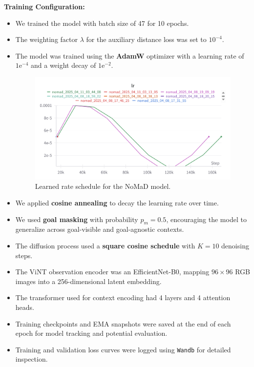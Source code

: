 \documentclass[12pt]{article}
\begin{document}
\begin{appendices}
\textbf{Training Configuration:}
 \begin{itemize}
     \item We trained the model with batch size of 47 for 10 epochs.
     \item The weighting factor $\lambda$ for the auxiliary distance loss was set to $10^{-4}$.
     \item The model was trained using the \textbf{AdamW} optimizer with a learning rate of $1\text{e}^{-4}$ and a weight decay of $1\text{e}^{-2}$.
        \begin{figure}[H]
            \centering
            \includegraphics[width=1\textwidth]{images/lr.png}
            \caption{Learned rate schedule for the NoMaD model.}
            \label{fig:lr}
        \end{figure}
     \item We applied \textbf{cosine annealing} to decay the learning rate over time.
     \item We used \textbf{goal masking} with probability $p_m = 0.5$, encouraging the model to generalize across goal-visible and goal-agnostic contexts.
     \item The diffusion process used a \textbf{square cosine schedule} with $K = 10$ denoising steps.
     \item The ViNT observation encoder was an EfficientNet-B0, mapping $96 \times 96$ RGB images into a 256-dimensional latent embedding.
     \item The transformer used for context encoding had 4 layers and 4 attention heads.
     \item Training checkpoints and EMA snapshots were saved at the end of each epoch for model tracking and potential evaluation.
     \item Training and validation loss curves were logged using \texttt{Wandb} for detailed inspection.
\end{itemize}


\end{appendices}
\end{document}
